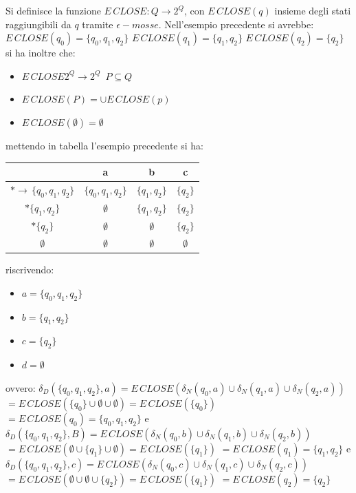 Si definisce la funzione $E\,CLOSE:Q\to 2^Q$, con $E\,CLOSE(q)$ insieme degli stati raggiungibili da $q$ tramite $\epsilon-mosse$. Nell'esempio precedente si avrebbe:
$E\,CLOSE(q_0)=\{q_0,q_1,q_2\}$
$E\,CLOSE(q_1)=\{q_1,q_2\}$
$E\,CLOSE(q_2)=\{q_2\}$
si ha inoltre che:
\begin{itemize}
	\item $E\,CLOSE 2^Q\to 2^Q\,\,\, P\subseteq Q$
	\item $E\,CLOSE(P)=\cup E\,CLOSE(p)$
	\item $E\,CLOSE(\emptyset)=\emptyset$
\end{itemize}
mettendo in tabella l'esempio precedente si ha:
\begin{center}
	\begin{tabular}{c|c|c|c}
		                        & a                 & b             & c           \\
		\hline
		$*\to\,\{q_0,q_1,q_2\}$ & $\{q_0,q_1,q_2\}$ & $\{q_1,q_2\}$ & $\{q_2\}$   \\
		\hline
		$*\{q_1,q_2\}$          & $\emptyset$       & $\{q_1,q_2\}$ & $\{q_2\}$   \\
		\hline
		$*\{q_2\}$              & $\emptyset$       & $\emptyset$   & $\{q_2\}$   \\
		\hline
		$\emptyset$             & $\emptyset$       & $\emptyset$   & $\emptyset$
	\end{tabular}
\end{center}
riscrivendo:
\begin{itemize}
	\item $a=\{q_0,q_1,q_2\}$
	\item $b=\{q_1,q_2\}$
	\item $c=\{q_2\}$
	\item $d=\emptyset$
\end{itemize}
ovvero:
$\delta_D(\{q_0,q_1,q_2\},a)=E\,CLOSE(\delta_N(q_0,a)\cup \delta_N(q_1,a)\cup \delta_N(q_2,a))$
$=E\,CLOSE(\{q_0\} \cup \emptyset\cup \emptyset)=E\,CLOSE(\{q_0\})$
$=E\,CLOSE	(q_0)=\{q_0,q_1,q_2\}$
e
$\delta_D(\{q_0,q_1,q_2\},B)=E\,CLOSE(\delta_N(q_0,b)\cup \delta_N(q_1,b)\cup \delta_N(q_2,b))$
$=E\,CLOSE(\emptyset \cup \{q_1\}\cup \emptyset)=E\,CLOSE(\{q_1\})$
$=E\,CLOSE	(q_1)=\{q_1,q_2\}$
e
$\delta_D(\{q_0,q_1,q_2\},c)=E\,CLOSE(\delta_N(q_0,c)\cup \delta_N(q_1,c)\cup \delta_N(q_2,c))$
$=E\,CLOSE(\emptyset \cup \emptyset\cup \{q_2\})=E\,CLOSE(\{q_1\})$
$=E\,CLOSE	(q_2)=\{q_2\}$

